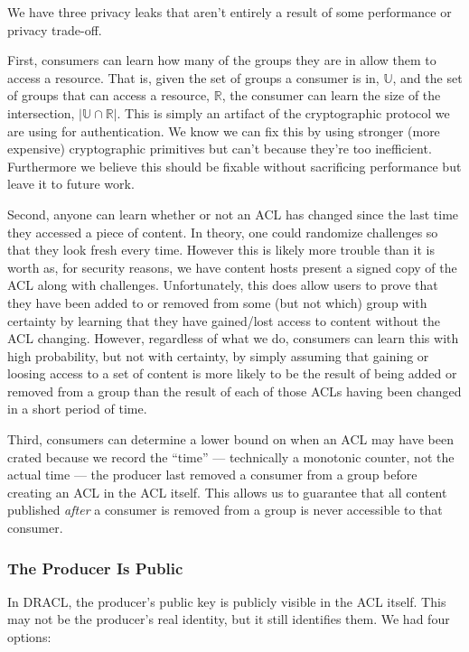 \documentclass[pdftex,12pt,a4papaer,twoside,notitlepage]{report}
\begin{document}
We have three privacy leaks that aren't entirely a result of some performance or
privacy trade-off.

First, consumers can learn how many of the groups they are in allow them to
access a resource. That is, given the set of groups a consumer is in,
$\mathbb{U}$, and the set of groups that can access a resource, $\mathbb{R}$,
the consumer can learn the size of the intersection, $|\mathbb{U} \cap
\mathbb{R}|$. This is simply an artifact of the cryptographic protocol we are
using for authentication. We know we can fix this by using stronger (more
expensive) cryptographic primitives but can't because they're too inefficient.
Furthermore we believe this should be fixable without sacrificing performance
but leave it to future work.

Second, anyone can learn whether or not an ACL has changed since the last time
they accessed a piece of content. In theory, one could randomize challenges so
that they look fresh every time. However this is likely more trouble than it is
worth as, for security reasons, we have content hosts present a signed copy of
the ACL along with challenges. Unfortunately, this does allow users to prove
that they have been added to or removed from some (but not which) group with
certainty by learning that they have gained/lost access to content without the
ACL changing. However, regardless of what we do, consumers can learn this with
high probability, but not with certainty, by simply assuming that gaining or
loosing access to a set of content is more likely to be the result of being
added or removed from a group than the result of each of those ACLs having been
changed in a short period of time.

Third, consumers can determine a lower bound on when an ACL may have been crated
because we record the ``time'' --- technically a monotonic counter, not the
actual time --- the producer last removed a consumer from a group before creating
an ACL in the ACL itself. This allows us to guarantee that all content published
\emph{after} a consumer is removed from a group is never accessible to that
consumer.

\subsubsection{The Producer Is Public}
\label{sub:producer_public}

In DRACL, the producer's public key is publicly visible in the ACL itself. This
may not be the producer's real identity, but it still identifies them. We had
four options:
\end{document}
